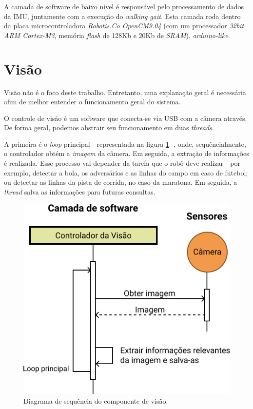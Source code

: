 A camada de software de baixo nível é responsável pelo processamento de dados da IMU, juntamente com a execução do \textit{walking gait}. Esta camada roda dentro da placa microcontroladora \textit{Robotis.Co OpenCM9.04} (com um processador \textit{32bit ARM Cortex-M3}, memória \textit{flash} de 128Kb e 20Kb de \textit{SRAM}), \textit{arduino-like}.

\section{Visão}

Visão não é o foco deste trabalho. Entretanto, uma explanação geral é necessária afim de melhor entender o funcionamento geral do sistema.

O controle de visão é um software que conecta-se via USB com a câmera através. De forma geral, podemos abstrair seu funcionamento em duas \textit{threads}.

A primeira é o \textit{loop} principal - representada na figura \ref{fig:SoftwareArchitecture:Vision} -, onde, sequêncialmente, o controlador obtém a \textit{imagem} da câmera. Em seguida, a extração de informações é realizada. Esse processo vai depender da tarefa que o robô deve realizar - por exemplo, detectar a bola, os adversários e as linhas do campo em caso de futebol; ou detectar as linhas da pista de corrida, no caso da maratona. Em seguida, a \textit{thread} salva as informações para futuras consultas.

\begin{figure}[h!]
	\centering
	\includegraphics[scale=1]{imagens/svg/softwarearchitecture-vision}
	\caption{Diagrama de sequência do componente de visão.}
	\label{fig:SoftwareArchitecture:Vision}
\end{figure}

